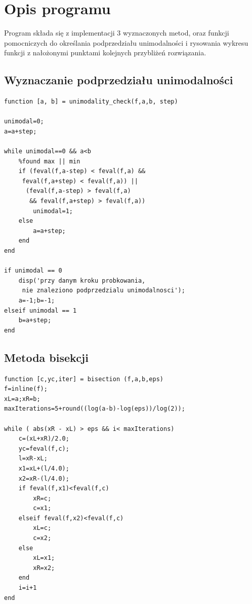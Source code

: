 \documentclass{classrep}
\begin{document}
\section{Opis programu}

Program składa się z implementacji 3 wyznaczonych metod, oraz funkcji pomocniczych do określania podprzedziału unimodalności i rysowania wykresu funkcji z nałożonymi punktami kolejnych przybliżeń rozwiązania.

\subsection{Wyznaczanie podprzedziału unimodalności}
\begin{lstlisting}
function [a, b] = unimodality_check(f,a,b, step)

unimodal=0;
a=a+step;

while unimodal==0 && a<b
    %found max || min
    if (feval(f,a-step) < feval(f,a) &&
     feval(f,a+step) < feval(f,a)) ||
      (feval(f,a-step) > feval(f,a)
       && feval(f,a+step) > feval(f,a))
        unimodal=1;
    else
        a=a+step;
    end
end

if unimodal == 0
    disp('przy danym kroku probkowania,
     nie znaleziono podprzedzialu unimodalnosci');
    a=-1;b=-1; 
elseif unimodal == 1
    b=a+step;
end
\end{lstlisting}

\subsection{Metoda bisekcji}
\begin{lstlisting}
function [c,yc,iter] = bisection (f,a,b,eps)
f=inline(f);
xL=a;xR=b;
maxIterations=5+round((log(a-b)-log(eps))/log(2));

while ( abs(xR - xL) > eps && i< maxIterations)
    c=(xL+xR)/2.0;
    yc=feval(f,c);
    l=xR-xL;
    x1=xL+(l/4.0);
    x2=xR-(l/4.0);
    if feval(f,x1)<feval(f,c)
        xR=c;
        c=x1;
    elseif feval(f,x2)<feval(f,c)
        xL=c;
        c=x2;
    else
        xL=x1;
        xR=x2;
    end
    i=i+1
end
\end{lstlisting}
\end{document}
